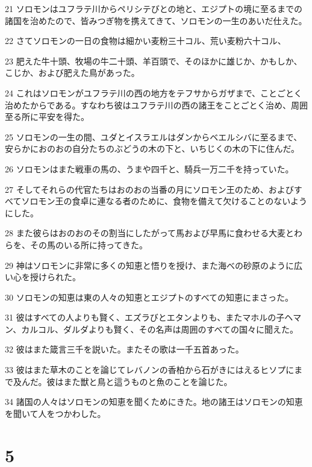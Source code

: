 \par 21 ソロモンはユフラテ川からペリシテびとの地と、エジプトの境に至るまでの諸国を治めたので、皆みつぎ物を携えてきて、ソロモンの一生のあいだ仕えた。
\par 22 さてソロモンの一日の食物は細かい麦粉三十コル、荒い麦粉六十コル、
\par 23 肥えた牛十頭、牧場の牛二十頭、羊百頭で、そのほかに雄じか、かもしか、こじか、および肥えた鳥があった。
\par 24 これはソロモンがユフラテ川の西の地方をテフサからガザまで、ことごとく治めたからである。すなわち彼はユフラテ川の西の諸王をことごとく治め、周囲至る所に平安を得た。
\par 25 ソロモンの一生の間、ユダとイスラエルはダンからベエルシバに至るまで、安らかにおのおの自分たちのぶどうの木の下と、いちじくの木の下に住んだ。
\par 26 ソロモンはまた戦車の馬の、うまや四千と、騎兵一万二千を持っていた。
\par 27 そしてそれらの代官たちはおのおの当番の月にソロモン王のため、およびすべてソロモン王の食卓に連なる者のために、食物を備えて欠けることのないようにした。
\par 28 また彼らはおのおのその割当にしたがって馬および早馬に食わせる大麦とわらを、その馬のいる所に持ってきた。
\par 29 神はソロモンに非常に多くの知恵と悟りを授け、また海べの砂原のように広い心を授けられた。
\par 30 ソロモンの知恵は東の人々の知恵とエジプトのすべての知恵にまさった。
\par 31 彼はすべての人よりも賢く、エズラびとエタンよりも、またマホルの子ヘマン、カルコル、ダルダよりも賢く、その名声は周囲のすべての国々に聞えた。
\par 32 彼はまた箴言三千を説いた。またその歌は一千五首あった。
\par 33 彼はまた草木のことを論じてレバノンの香柏から石がきにはえるヒソプにまで及んだ。彼はまた獣と鳥と這うものと魚のことを論じた。
\par 34 諸国の人々はソロモンの知恵を聞くためにきた。地の諸王はソロモンの知恵を聞いて人をつかわした。

\chapter{5}

